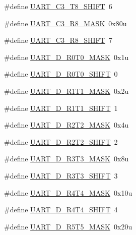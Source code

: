 \begin{DoxyCompactItemize}
\#define \hyperlink{group___u_a_r_t___register___masks_ga98e310521d3edf56770be85701a65142}{U\+A\+R\+T\+\_\+\+C3\+\_\+\+T8\+\_\+\+S\+H\+I\+FT}~6
\item 
\#define \hyperlink{group___u_a_r_t___register___masks_gae17bda6e18ad786d2cedf0105976d9dc}{U\+A\+R\+T\+\_\+\+C3\+\_\+\+R8\+\_\+\+M\+A\+SK}~0x80u
\item 
\#define \hyperlink{group___u_a_r_t___register___masks_gab1799b4eb595a66cc5995e206e001f78}{U\+A\+R\+T\+\_\+\+C3\+\_\+\+R8\+\_\+\+S\+H\+I\+FT}~7
\item 
\#define \hyperlink{group___u_a_r_t___register___masks_ga94aee6b9157bc7a9c420df0d32e9a74f}{U\+A\+R\+T\+\_\+\+D\+\_\+\+R0\+T0\+\_\+\+M\+A\+SK}~0x1u
\item 
\#define \hyperlink{group___u_a_r_t___register___masks_ga02f3575616f87fb4ad3ebecd34e9e5e8}{U\+A\+R\+T\+\_\+\+D\+\_\+\+R0\+T0\+\_\+\+S\+H\+I\+FT}~0
\item 
\#define \hyperlink{group___u_a_r_t___register___masks_ga8be227e8f3e1d85a53471e62843fb090}{U\+A\+R\+T\+\_\+\+D\+\_\+\+R1\+T1\+\_\+\+M\+A\+SK}~0x2u
\item 
\#define \hyperlink{group___u_a_r_t___register___masks_gae42dca2e1f080e29047b80767b1ad134}{U\+A\+R\+T\+\_\+\+D\+\_\+\+R1\+T1\+\_\+\+S\+H\+I\+FT}~1
\item 
\#define \hyperlink{group___u_a_r_t___register___masks_ga91fe538212e8ddaa83619d0663361156}{U\+A\+R\+T\+\_\+\+D\+\_\+\+R2\+T2\+\_\+\+M\+A\+SK}~0x4u
\item 
\#define \hyperlink{group___u_a_r_t___register___masks_ga2bc644d6343a678027c481a7276f0365}{U\+A\+R\+T\+\_\+\+D\+\_\+\+R2\+T2\+\_\+\+S\+H\+I\+FT}~2
\item 
\#define \hyperlink{group___u_a_r_t___register___masks_gaf206d6756322fbbc680f6fbf8adb32ad}{U\+A\+R\+T\+\_\+\+D\+\_\+\+R3\+T3\+\_\+\+M\+A\+SK}~0x8u
\item 
\#define \hyperlink{group___u_a_r_t___register___masks_ga79c4f0e85437abe944090bec2787e002}{U\+A\+R\+T\+\_\+\+D\+\_\+\+R3\+T3\+\_\+\+S\+H\+I\+FT}~3
\item 
\#define \hyperlink{group___u_a_r_t___register___masks_gaccf079a149681c0c44ad35273a0a379e}{U\+A\+R\+T\+\_\+\+D\+\_\+\+R4\+T4\+\_\+\+M\+A\+SK}~0x10u
\item 
\#define \hyperlink{group___u_a_r_t___register___masks_ga72a1cfecb08c81730413daeb891473bb}{U\+A\+R\+T\+\_\+\+D\+\_\+\+R4\+T4\+\_\+\+S\+H\+I\+FT}~4
\item 
\#define \hyperlink{group___u_a_r_t___register___masks_gac364217c4f177099d2de9cb34bbbb46e}{U\+A\+R\+T\+\_\+\+D\+\_\+\+R5\+T5\+\_\+\+M\+A\+SK}~0x20u

\end{DoxyCompactItemize}
